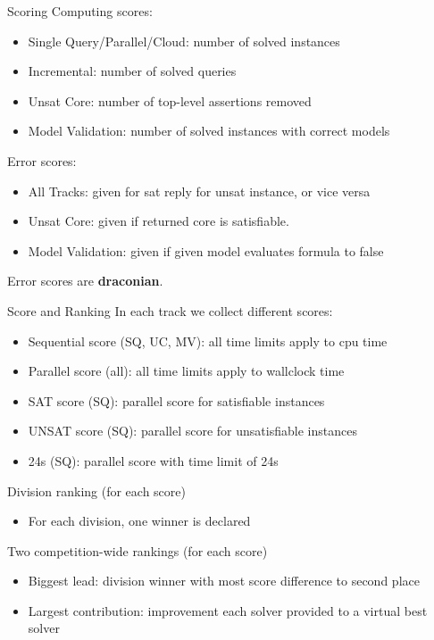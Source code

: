 \documentclass[table]{beamer}
\def\emph#1{\textcolor{MYblue}{#1}}
\begin{document}
\begin{frame}{Scoring}
  Computing scores:
  \begin{itemize}
  \item \emph{Single Query/Parallel/Cloud}: number of solved \emph{instances}
  \item \emph{Incremental}: number of solved \emph{queries}
  \item \emph{Unsat Core}: number of top-level assertions \emph{removed}
  \item \emph{Model Validation}: number of solved instances with correct \emph{models}
  \end{itemize}

  \bigskip
  Error scores:
  \begin{itemize}
  \item \emph{All Tracks}: given for sat reply for unsat instance, or vice versa
  \item \emph{Unsat Core}: given if returned core is satisfiable.
  \item \emph{Model Validation}: given if given model evaluates formula to \emph{false}
  \end{itemize}
  Error scores are \textbf{draconian}.
\end{frame}

\begin{frame}{Score and Ranking}
  In each track we collect different scores:
  \begin{itemize}
  \item \emph{Sequential score} (SQ, UC, MV): all time limits apply to cpu time
  \item \emph{Parallel score} (all): all time limits apply to wallclock time
  \item \emph{SAT score} (SQ): parallel score for \emph{satisfiable} instances
  \item \emph{UNSAT score} (SQ): parallel score for \emph{unsatisfiable} instances
  \item \emph{24s} (SQ): parallel score with time limit of \emph{24s}
  \end{itemize}
  \bigskip

  Division ranking (for each score)
  \begin{itemize}
  \item For each division, one winner is declared
  \end{itemize}

  \bigskip

  Two competition-wide rankings (for each score)
  \begin{itemize}
  \item \emph{Biggest lead}: division winner with most score difference to second place
  \item \emph{Largest contribution}: improvement each solver provided to a virtual best solver
  \end{itemize}

\end{frame}
\end{document}
